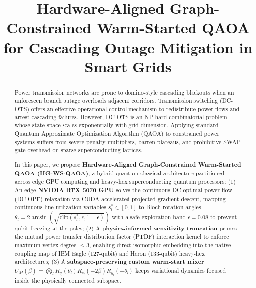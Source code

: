 \documentclass[conference]{IEEEtran}
\begin{document}
\title{Hardware-Aligned Graph-Constrained Warm-Started QAOA for Cascading Outage Mitigation in Smart Grids}

\author{
}

\maketitle

\begin{abstract}
Power transmission networks are prone to domino-style cascading blackouts when an unforeseen branch outage overloads adjacent corridors. Transmission switching (DC-OTS) offers an effective operational control mechanism to redistribute power flows and arrest cascading failures. However, DC-OTS is an NP-hard combinatorial problem whose state space scales exponentially with grid dimension. Applying standard Quantum Approximate Optimization Algorithm (QAOA) to constrained power systems suffers from severe penalty multipliers, barren plateaus, and prohibitive SWAP gate overhead on sparse superconducting lattices. 

In this paper, we propose \textbf{Hardware-Aligned Graph-Constrained Warm-Started QAOA (HG-WS-QAOA)}, a hybrid quantum-classical architecture partitioned across edge GPU computing and heavy-hex superconducting quantum processors:
(1) An edge \textbf{NVIDIA RTX 5070 GPU} solves the continuous DC optimal power flow (DC-OPF) relaxation via CUDA-accelerated projected gradient descent, mapping continuous line utilization variables $s_l^* \in [0, 1]$ to Bloch rotation angles $\theta_l = 2 \arcsin(\sqrt{\text{clip}(s_l^*, \epsilon, 1-\epsilon)})$ with a safe-exploration band $\epsilon = 0.08$ to prevent qubit freezing at the poles;
(2) A \textbf{physics-informed sensitivity truncation} prunes the mutual power transfer distribution factor (PTDF) interaction kernel to enforce maximum vertex degree $\le 3$, enabling direct isomorphic embedding into the native coupling map of IBM Eagle (127-qubit) and Heron (133-qubit) heavy-hex architectures;
(3) A \textbf{subspace-preserving custom warm-start mixer} $U_M(\beta) = \bigotimes_l R_{y_l}(\theta_l) R_{z_l}(-2\beta) R_{y_l}(-\theta_l)$ keeps variational dynamics focused inside the physically connected subspace.


\end{abstract}
\end{document}
